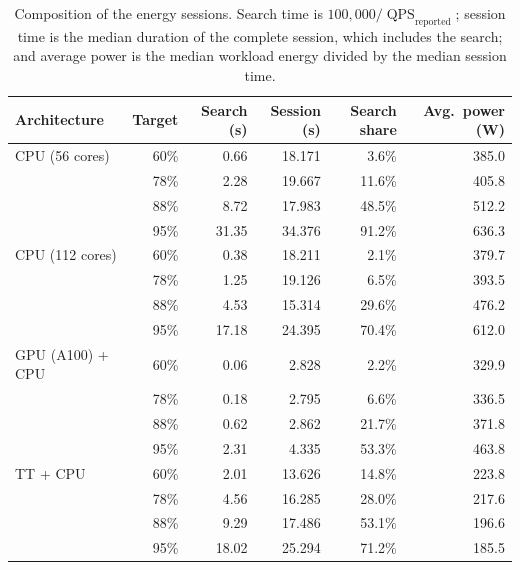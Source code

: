 \begin{table}[htbp]
\centering
\caption{Composition of the energy sessions. Search time is
\(100{,}000/\operatorname{QPS}_{\mathrm{reported}}\); session time is the
median duration of the complete session, which includes the search; and
average power is the median workload energy divided by the median session
time.}
\label{tab:energy-session-composition}
\small
\setlength{\tabcolsep}{4pt}
\renewcommand{\arraystretch}{1.08}
\begin{tabular}{lrrrrr}
\toprule
Architecture & Target & Search (s) & Session (s) & Search share & Avg.\ power (W) \\
\midrule
CPU (56 cores)   & 60\% & 0.66  & 18.171 & 3.6\%  & 385.0 \\
                 & 78\% & 2.28  & 19.667 & 11.6\% & 405.8 \\
                 & 88\% & 8.72  & 17.983 & 48.5\% & 512.2 \\
                 & 95\% & 31.35 & 34.376 & 91.2\% & 636.3 \\
\midrule
CPU (112 cores)  & 60\% & 0.38  & 18.211 & 2.1\%  & 379.7 \\
                 & 78\% & 1.25  & 19.126 & 6.5\%  & 393.5 \\
                 & 88\% & 4.53  & 15.314 & 29.6\% & 476.2 \\
                 & 95\% & 17.18 & 24.395 & 70.4\% & 612.0 \\
\midrule
GPU (A100) + CPU & 60\% & 0.06  & 2.828  & 2.2\%  & 329.9 \\
                 & 78\% & 0.18  & 2.795  & 6.6\%  & 336.5 \\
                 & 88\% & 0.62  & 2.862  & 21.7\% & 371.8 \\
                 & 95\% & 2.31  & 4.335  & 53.3\% & 463.8 \\
\midrule
TT + CPU         & 60\% & 2.01  & 13.626 & 14.8\% & 223.8 \\
                 & 78\% & 4.56  & 16.285 & 28.0\% & 217.6 \\
                 & 88\% & 9.29  & 17.486 & 53.1\% & 196.6 \\
                 & 95\% & 18.02 & 25.294 & 71.2\% & 185.5 \\
\bottomrule
\end{tabular}
\end{table}

